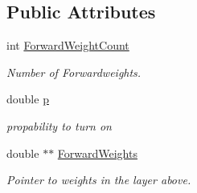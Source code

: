 \subsection*{Public Attributes}
\begin{DoxyCompactItemize}
\item 
\hypertarget{class_n_n_t_lib_1_1_d_b_n_neuron_a3ad1778b3739e6bf1f232583e01ab714}{}int \hyperlink{class_n_n_t_lib_1_1_d_b_n_neuron_a3ad1778b3739e6bf1f232583e01ab714}{Forward\+Weight\+Count}\label{class_n_n_t_lib_1_1_d_b_n_neuron_a3ad1778b3739e6bf1f232583e01ab714}

\begin{DoxyCompactList}\small\item\em Number of Forwardweights. \end{DoxyCompactList}\item 
\hypertarget{class_n_n_t_lib_1_1_d_b_n_neuron_a01d8094168eaba8e4b04cb3c934ef407}{}double \hyperlink{class_n_n_t_lib_1_1_d_b_n_neuron_a01d8094168eaba8e4b04cb3c934ef407}{p}\label{class_n_n_t_lib_1_1_d_b_n_neuron_a01d8094168eaba8e4b04cb3c934ef407}

\begin{DoxyCompactList}\small\item\em propability to turn on \end{DoxyCompactList}\item 
\hypertarget{class_n_n_t_lib_1_1_d_b_n_neuron_a728f1107afb0cad3e812c142c0c521e7}{}double $\ast$$\ast$ \hyperlink{class_n_n_t_lib_1_1_d_b_n_neuron_a728f1107afb0cad3e812c142c0c521e7}{Forward\+Weights}\label{class_n_n_t_lib_1_1_d_b_n_neuron_a728f1107afb0cad3e812c142c0c521e7}

\begin{DoxyCompactList}\small\item\em Pointer to weights in the layer above. \end{DoxyCompactList}\end{DoxyCompactItemize}
